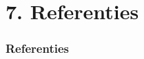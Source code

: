 \documentclass[aspectratio=169]{beamer}
\begin{document}
    \section{7. Referenties}
    \begin{frame}[allowframebreaks]
        \frametitle{Referenties}
        \printbibliography
    \end{frame}
    
\end{document}
